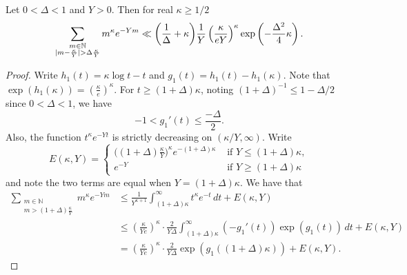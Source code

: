 \documentclass[10pt,a4paper]{amsart}
\begin{document}
\begin{lemma} \label{lem:incomplete}
Let $0< \Delta <1$ and $Y>0$. Then for real $\kappa \ge 1/2$
\begin{equation} \notag
\sum_{\substack{m \in \mathbb N \\|m -\frac{\kappa}{Y}|> \Delta \frac{\kappa}{Y}}} m^{\kappa} e^{-Ym}\ll \bigg(\frac{1}{ \Delta } + \kappa \bigg)\frac{1}{Y}\left( \frac{\kappa}{e Y}\right)^{\kappa} \exp\left( -\frac{\Delta^2}{4} \kappa \right) .
\end{equation}
\end{lemma}

\begin{proof}
Write $h_1(t)=\kappa \log t-t$ and $g_1(t)=h_1(t)-h_1(\kappa)$. Note that $\exp(h_1(\kappa))=\left( \frac{\kappa}{e}\right)^{\kappa}$. For $ t \ge (1+\Delta) \kappa$, noting $(1+\Delta)^{-1} \le 1-\Delta/2$ since $0< \Delta <1$, we have
\[
-1 < g_1'(t) \le  \frac{-\Delta}{2}.
\]
Also, the function $t^{\kappa}e^{-Yt}$ is strictly decreasing on $ (\kappa/Y, \infty)$. Write
\begin{equation*}
E(\kappa,Y)=\begin{cases}
\big((1+\Delta) \frac{\kappa}{Y} \big)^{\kappa} e^{-(1+\Delta)\kappa}  & \text{ if } Y \le (1+\Delta)\kappa,\\
e^{-Y}  & \text{ if } Y \ge (1+\Delta)\kappa
\end{cases}
\end{equation*}
and note the two terms are equal when $Y=(1+\Delta)\kappa$.
We have that
\[
\begin{split}
\sum_{\substack{m \in \mathbb N \\ m > (1+\Delta) \frac{\kappa}{Y}}} m^{\kappa} e^{-Ym} & \le \frac{1}{Y^{\kappa+1}} \int_{(1+\Delta)\kappa}^{\infty} t^{\kappa} e^{-t} \, dt+E(\kappa,Y) \\
& \le \left( \frac{\kappa}{Ye}\right)^{\kappa} \cdot \frac{2 }{Y\Delta} \int_{(1+\Delta)\kappa}^{\infty}(-g_1'(t)) \exp(g_1(t)) \, dt+E(\kappa,Y)\\
&=\left( \frac{\kappa}{Ye}\right)^{\kappa} \cdot \frac{2}{Y\Delta} \exp(g_1((1+\Delta)\kappa))+E(\kappa,Y).
\end{split}
\]



\end{proof}
\end{document}
